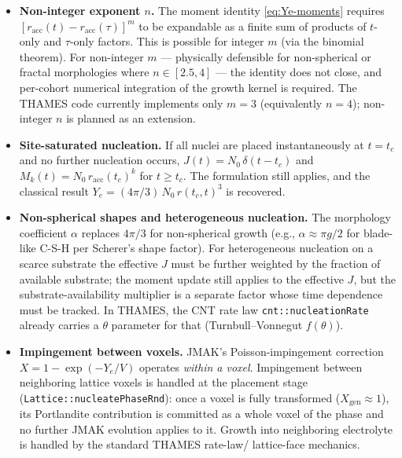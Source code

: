 \documentclass[11pt]{article}
\begin{document}
\begin{itemize}
\item \textbf{Non-integer exponent $n$.} The moment identity
      \eqref{eq:Ye-moments} requires $[r_{\text{acc}}(t) -
      r_{\text{acc}}(\tau)]^{m}$ to be expandable as a finite sum of
      products of $t$-only and $\tau$-only factors. This is possible
      for integer $m$ (via the binomial theorem). For non-integer
      $m$ — physically defensible for non-spherical or fractal
      morphologies where $n \in [2.5, 4]$ — the identity does not
      close, and per-cohort numerical integration of the growth
      kernel is required. The THAMES code currently implements only
      $m = 3$ (equivalently $n = 4$); non-integer $n$ is planned as
      an extension.

\item \textbf{Site-saturated nucleation.} If all nuclei are placed
      instantaneously at $t = t_c$ and no further nucleation occurs,
      $J(t) = N_0\, \delta(t - t_c)$ and
      $M_k(t) = N_0\, r_{\text{acc}}(t_c)^{k}$ for $t \geq t_c$.
      The formulation still applies, and the classical result
      $Y_e = (4\pi/3)\, N_0\, r(t_c, t)^{3}$ is recovered.

\item \textbf{Non-spherical shapes and heterogeneous nucleation.} The
      morphology coefficient $\alpha$ replaces $4\pi/3$ for
      non-spherical growth (e.g., $\alpha \approx \pi g / 2$ for
      blade-like C-S-H per Scherer's shape factor). For heterogeneous
      nucleation on a scarce substrate the effective $J$ must be
      further weighted by the fraction of available substrate; the
      moment update still applies to the effective $J$, but the
      substrate-availability multiplier is a separate factor whose
      time dependence must be tracked. In THAMES, the CNT rate law
      \texttt{cnt::nucleationRate} already carries a $\theta$
      parameter for that (Turnbull--Vonnegut $f(\theta)$).

\item \textbf{Impingement between voxels.} JMAK's Poisson-impingement
      correction $X = 1 - \exp(-Y_e/V)$ operates \emph{within a
      voxel}. Impingement between neighboring lattice voxels is
      handled at the placement stage
      (\texttt{Lattice::nucleatePhaseRnd}): once a voxel is fully
      transformed ($X_{\text{gen}} \approx 1$), its Portlandite
      contribution is committed as a whole voxel of the phase and no
      further JMAK evolution applies to it. Growth into neighboring
      electrolyte is handled by the standard THAMES rate-law/
      lattice-face mechanics.
\end{itemize}
\end{document}
